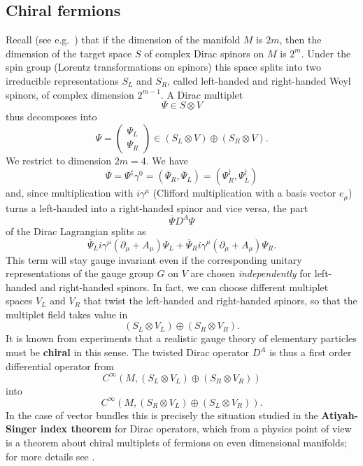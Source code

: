 \documentclass[11pt]{amsart}
\theoremstyle{definition}
\theoremstyle{remark}
\numberwithin{equation}{section}
\begin{document}
\subsection{Chiral fermions}
Recall (see e.g.~\cite{Morgan}) that if the dimension of the manifold $M$ is $2m$, then the dimension of the target space $S$ of complex Dirac spinors on $M$ is $2^m$. Under the spin group (Lorentz transformations on spinors) this space splits into two irreducible representations $S_L$ and $S_R$, called left-handed and right-handed Weyl spinors, of complex dimension $2^{m-1}$. A Dirac multiplet
\begin{equation*}
\Psi\in S\otimes V
\end{equation*}
thus decomposes into
\begin{equation*}
\Psi=\left(\begin{array}{c}\Psi_L \\ \Psi_R  \end{array}\right)\in (S_L\otimes V)\oplus (S_R\otimes V).
\end{equation*}
We restrict to dimension $2m=4$. We have 
\begin{equation*}
\overline{\Psi}=\Psi^\dagger\gamma^0=\left(\overline{\Psi}_R,\overline{\Psi}_L\right)=\left(\Psi^\dagger_R,\Psi^\dagger_L\right)
\end{equation*}
and, since multiplication with $i\gamma^\mu$ (Clifford multiplication with a basis vector $e_\mu$) turns a left-handed into a right-handed spinor and vice versa, the part
\begin{equation*}
\overline{\Psi}D^A\Psi
\end{equation*}
of the Dirac Lagrangian splits as
\begin{equation*}
\overline{\Psi}_Li\gamma^\mu(\partial_\mu+A_\mu)\Psi_L+\overline{\Psi}_Ri\gamma^\mu(\partial_\mu+A_\mu)\Psi_R.
\end{equation*}
This term will stay gauge invariant even if the corresponding unitary representations of the gauge group $G$ on $V$ are chosen {\em independently} for left-handed and right-handed spinors. In fact, we can choose different multiplet spaces $V_L$ and $V_R$ that twist the left-handed and right-handed spinors, so that the multiplet field takes value in
\begin{equation*}
(S_L\otimes V_L)\oplus (S_R\otimes V_R).
\end{equation*}
It is known from experiments that a realistic gauge theory of elementary particles must be {\bf chiral} in this sense. The twisted Dirac operator $D^A$ is thus a first order differential operator from
\begin{equation*}
C^\infty(M,(S_L\otimes V_L)\oplus (S_R\otimes V_R))
\end{equation*}
into
\begin{equation*}
C^\infty(M,(S_R\otimes V_L)\oplus (S_L\otimes V_R)).
\end{equation*}
In the case of vector bundles this is precisely the situation studied in the {\bf Atiyah-Singer index theorem} for Dirac operators, which from a physics point of view is a theorem about chiral multiplets of fermions on even dimensional manifolds; for more details see \cite{Berline}. 
\end{document}
